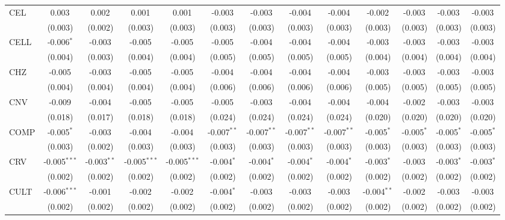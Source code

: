 \begin{table}[!htbp]
\begin{tabular}{@{\extracolsep{5pt}}lcccccccccccc}
 CEL & 0.003$^{}$ & 0.002$^{}$ & 0.001$^{}$ & 0.001$^{}$ & -0.003$^{}$ & -0.003$^{}$ & -0.004$^{}$ & -0.004$^{}$ & -0.002$^{}$ & -0.003$^{}$ & -0.003$^{}$ & -0.003$^{}$ \\
  & (0.003) & (0.002) & (0.003) & (0.003) & (0.003) & (0.003) & (0.003) & (0.003) & (0.003) & (0.003) & (0.003) & (0.003) \\
 CELL & -0.006$^{*}$ & -0.003$^{}$ & -0.005$^{}$ & -0.005$^{}$ & -0.005$^{}$ & -0.004$^{}$ & -0.004$^{}$ & -0.004$^{}$ & -0.003$^{}$ & -0.003$^{}$ & -0.003$^{}$ & -0.003$^{}$ \\
  & (0.004) & (0.003) & (0.004) & (0.004) & (0.005) & (0.005) & (0.005) & (0.005) & (0.004) & (0.004) & (0.004) & (0.004) \\
 CHZ & -0.005$^{}$ & -0.003$^{}$ & -0.005$^{}$ & -0.005$^{}$ & -0.004$^{}$ & -0.004$^{}$ & -0.004$^{}$ & -0.004$^{}$ & -0.003$^{}$ & -0.003$^{}$ & -0.003$^{}$ & -0.003$^{}$ \\
  & (0.004) & (0.004) & (0.004) & (0.004) & (0.006) & (0.006) & (0.006) & (0.006) & (0.005) & (0.005) & (0.005) & (0.005) \\
 CNV & -0.009$^{}$ & -0.004$^{}$ & -0.005$^{}$ & -0.005$^{}$ & -0.005$^{}$ & -0.003$^{}$ & -0.004$^{}$ & -0.004$^{}$ & -0.004$^{}$ & -0.002$^{}$ & -0.003$^{}$ & -0.003$^{}$ \\
  & (0.018) & (0.017) & (0.018) & (0.018) & (0.024) & (0.024) & (0.024) & (0.024) & (0.020) & (0.020) & (0.020) & (0.020) \\
 COMP & -0.005$^{*}$ & -0.003$^{}$ & -0.004$^{}$ & -0.004$^{}$ & -0.007$^{**}$ & -0.007$^{**}$ & -0.007$^{**}$ & -0.007$^{**}$ & -0.005$^{*}$ & -0.005$^{*}$ & -0.005$^{*}$ & -0.005$^{*}$ \\
  & (0.003) & (0.002) & (0.003) & (0.003) & (0.003) & (0.003) & (0.003) & (0.003) & (0.003) & (0.003) & (0.003) & (0.003) \\
 CRV & -0.005$^{***}$ & -0.003$^{**}$ & -0.005$^{***}$ & -0.005$^{***}$ & -0.004$^{*}$ & -0.004$^{*}$ & -0.004$^{*}$ & -0.004$^{*}$ & -0.003$^{*}$ & -0.003$^{}$ & -0.003$^{*}$ & -0.003$^{*}$ \\
  & (0.002) & (0.002) & (0.002) & (0.002) & (0.002) & (0.002) & (0.002) & (0.002) & (0.002) & (0.002) & (0.002) & (0.002) \\
 CULT & -0.006$^{***}$ & -0.001$^{}$ & -0.002$^{}$ & -0.002$^{}$ & -0.004$^{*}$ & -0.003$^{}$ & -0.003$^{}$ & -0.003$^{}$ & -0.004$^{**}$ & -0.002$^{}$ & -0.003$^{}$ & -0.003$^{}$ \\
  & (0.002) & (0.002) & (0.002) & (0.002) & (0.002) & (0.002) & (0.002) & (0.002) & (0.002) & (0.002) & (0.002) & (0.002) \\

\end{tabular}
\end{table}
